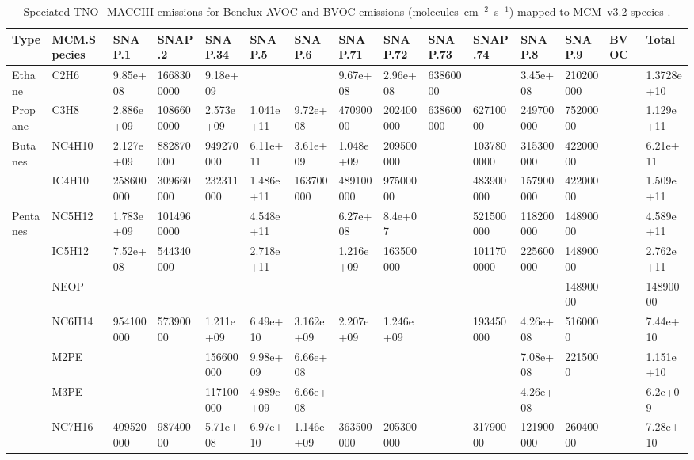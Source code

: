 \tiny
\begin{longtable}{lllllllllllllll}
    \caption{Speciated TNO\_MACCIII emissions for Benelux AVOC and BVOC emissions (molecules~cm$^{-2}$~s$^{-1}$) mapped to MCM~v3.2 species \citep{Kuenen:2014}.}\\%
	\hline \hline
	\textbf{Type} & \textbf{MCM.Species} & \textbf{SNAP.1} & \textbf{SNAP.2} & \textbf{SNAP.34} & \textbf{SNAP.5} & \textbf{SNAP.6} & \textbf{SNAP.71} & \textbf{SNAP.72} & \textbf{SNAP.73} & \textbf{SNAP.74} & \textbf{SNAP.8} & \textbf{SNAP.9} & \textbf{BVOC} & \textbf{Total}\\
	\endhead
	\hline
	Ethane & C2H6 & 9.85e+08 & 1668300000 & 9.18e+09 &  &  & 9.67e+08 & 2.96e+08 & 63860000 &  & 3.45e+08 & 210200000 &  & 1.3728e+10 \\
	\hline Propane & C3H8 & 2.886e+09 & 1086600000 & 2.573e+09 & 1.041e+11 & 9.72e+08 & 47090000 & 202400000 & 638600000 & 62710000 & 249700000 & 75200000 &  & 1.129e+11 \\ \hline
	\multirow{2}{*}{Butanes} & NC4H10 & 2.127e+09 & 882870000 & 949270000 & 6.11e+11 & 3.61e+09 & 1.048e+09 & 209500000 &  & 1037800000 & 315300000 & 42200000 &  & 6.21e+11 \\
	 & IC4H10 & 258600000 & 309660000 & 232311000 & 1.486e+11 & 163700000 & 489100000 & 97500000 &  & 483900000 & 157900000 & 42200000 &  & 1.509e+11 \\
	\hline \multirow{3}{*}{Pentanes} & NC5H12 & 1.783e+09 & 1014960000 &  & 4.548e+11 &  & 6.27e+08 & 8.4e+07 &  & 521500000 & 118200000 & 14890000 &  & 4.589e+11 \\
	 & IC5H12 & 7.52e+08 & 544340000 &  & 2.718e+11 &  & 1.216e+09 & 163500000 &  & 1011700000 & 225600000 & 14890000 &  & 2.762e+11 \\
	 & NEOP &  &  &  &  &  &  &  &  &  &  & 14890000 &  & 14890000 \\
	\hline \parbox[t]{2mm}{} & NC6H14 & 954100000 & 57390000 & 1.211e+09 & 6.49e+10 & 3.162e+09 & 2.207e+09 & 1.246e+09 &  & 193450000 & 4.26e+08 & 5160000 &  & 7.44e+10 \\
	 & M2PE &  &  & 156600000 & 9.98e+09 & 6.66e+08 &  &  &  &  & 7.08e+08 & 2215000 &  & 1.151e+10 \\
	 & M3PE &  &  & 117100000 & 4.989e+09 & 6.66e+08 &  &  &  &  & 4.26e+08 &  &  & 6.2e+09 \\
	 & NC7H16 & 409520000 & 98740000 & 5.71e+08 & 6.97e+10 & 1.146e+09 & 363500000 & 205300000 &  & 31790000 & 121900000 & 26040000 &  & 7.28e+10 \\

\end{longtable}

